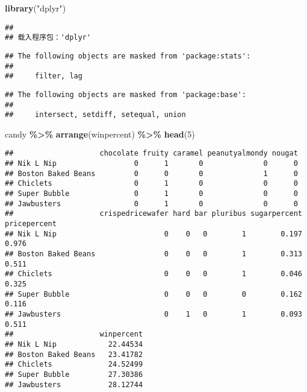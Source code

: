 \documentclass[
]{article}
\newenvironment{Shaded}{\begin{snugshade}}{\end{snugshade}}
\newcommand{\DecValTok}[1]{\textcolor[rgb]{0.00,0.00,0.81}{#1}}
\newcommand{\FunctionTok}[1]{\textcolor[rgb]{0.13,0.29,0.53}{\textbf{#1}}}
\newcommand{\NormalTok}[1]{#1}
\newcommand{\SpecialCharTok}[1]{\textcolor[rgb]{0.81,0.36,0.00}{\textbf{#1}}}
\newcommand{\StringTok}[1]{\textcolor[rgb]{0.31,0.60,0.02}{#1}}
\begin{document}
\begin{Shaded}
\begin{Highlighting}[]
\FunctionTok{library}\NormalTok{(}\StringTok{"dplyr"}\NormalTok{)}
\end{Highlighting}
\end{Shaded}

\begin{verbatim}
## 
## 载入程序包：'dplyr'
\end{verbatim}

\begin{verbatim}
## The following objects are masked from 'package:stats':
## 
##     filter, lag
\end{verbatim}

\begin{verbatim}
## The following objects are masked from 'package:base':
## 
##     intersect, setdiff, setequal, union
\end{verbatim}

\begin{Shaded}
\begin{Highlighting}[]
\NormalTok{candy }\SpecialCharTok{\%\textgreater{}\%} \FunctionTok{arrange}\NormalTok{(winpercent) }\SpecialCharTok{\%\textgreater{}\%} \FunctionTok{head}\NormalTok{(}\DecValTok{5}\NormalTok{)}
\end{Highlighting}
\end{Shaded}

\begin{verbatim}
##                    chocolate fruity caramel peanutyalmondy nougat
## Nik L Nip                  0      1       0              0      0
## Boston Baked Beans         0      0       0              1      0
## Chiclets                   0      1       0              0      0
## Super Bubble               0      1       0              0      0
## Jawbusters                 0      1       0              0      0
##                    crispedricewafer hard bar pluribus sugarpercent pricepercent
## Nik L Nip                         0    0   0        1        0.197        0.976
## Boston Baked Beans                0    0   0        1        0.313        0.511
## Chiclets                          0    0   0        1        0.046        0.325
## Super Bubble                      0    0   0        0        0.162        0.116
## Jawbusters                        0    1   0        1        0.093        0.511
##                    winpercent
## Nik L Nip            22.44534
## Boston Baked Beans   23.41782
## Chiclets             24.52499
## Super Bubble         27.30386
## Jawbusters           28.12744
\end{verbatim}
\end{document}
